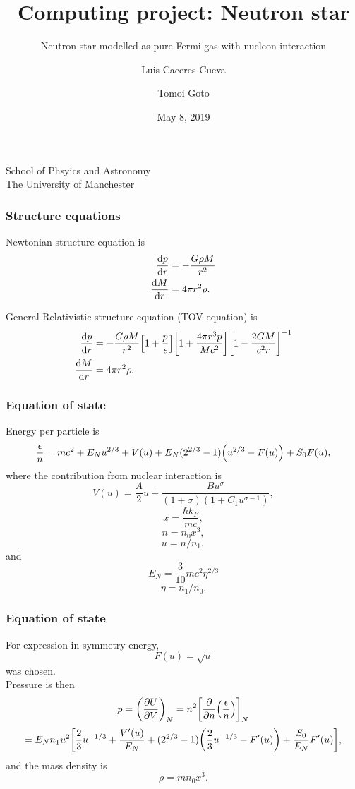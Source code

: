 \documentclass[hperref={pdfpagelabels=false}]{beamer}
\begin{document}
\title
{Computing project: Neutron star}

\subtitle{Neutron star modelled as pure Fermi gas with nucleon interaction}

\author
{Luis Caceres Cueva \and Tomoi Goto}

\institute
{
    School of Phsyics and Astronomy\\
    The University of Manchester
}
\date
{May 8, 2019}

\begin{frame}
 \titlepage
\end{frame}

\begin{frame}
 \frametitle{Structure equations}
 Newtonian structure equation is
 \begin{align*}
  \dv{p}{r}&=-\frac{G\rho M}{r^{2}}\\
  \dv{M}{r}&=4\pi r^{2}\rho.
 \end{align*}
 
General Relativistic structure equation (TOV equation) is
 \begin{align*}
  \dv{p}{r}&=-\frac{G\rho M}{r^{2}}\qty[1+\frac{p}{\epsilon}]\qty[1+\frac{4\pi r^{3}p}{Mc^{2}}]\qty[1-\frac{2GM}{c^{2}r}]^{-1}\\
  \dv{M}{r}&=4\pi r^{2}\rho.
 \end{align*}
\end{frame}

\begin{frame}
 \frametitle{Equation of state}
 Energy per particle is
\[\frac{\epsilon}{n}=mc^{2}+E_{N}u^{2/3}+V(u)+E_{N}(2^{2/3}-1)\qty(u^{2/3}-F(u))+S_{0}F(u),\]
 where the contribution from nuclear interaction is
 \[V(u)=\frac{A}{2}u+\frac{Bu^{\sigma}}{(1+\sigma)(1+C_{1}u^{\sigma-1})},\]
\[x=\frac{\hbar k_{F}}{mc},\]
 \[n=n_{0}x^{3},\]
 \[u=n/n_{1},\]
 and
 \[E_{N}=\frac{3}{10}mc^{2}\eta^{2/3}\]
 \[\eta=n_{1}/n_{0}.\]
\end{frame}

\begin{frame}
\frametitle{Equation of state}
 For expression in symmetry energy,
 \[F(u)=\sqrt{u}\]
 was chosen.\\
 Pressure is then 
 \[p=\qty(\pdv{U}{V})_{N}=n^{2}\qty[\pdv{n}(\frac{\epsilon}{n})]_{N}\]
 \[=E_{N}n_{1}u^{2}\qty[\frac{2}{3}u^{-1/3}+\frac{V'(u)}{E_{N}}+(2^{2/3}-1)\qty(\frac{2}{3}u^{-1/3}-F'(u))+\frac{S_{0}}{E_{N}}F'(u)],\]
 and the mass density is
 \[\rho=mn_{0}x^{3}.\]
\end{frame}
\end{document}
